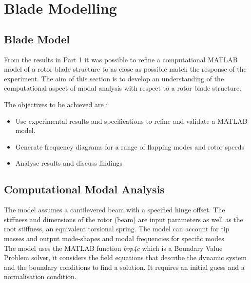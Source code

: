 \documentclass[11pt]{article}
\begin{document}
\section{Blade Modelling}
\subsection{Blade Model}
From the results in Part 1 it was possible to refine a computational MATLAB model of a rotor blade structure to as close as possible match the response of the experiment.
The aim of this section is to develop an understanding of the computational aspect of modal analysis with respect to a rotor blade structure.

The objectives to be achieved are :

\begin{itemize}
    \item Use experimental results and specifications to refine and validate a MATLAB model.
    \item Generate frequency diagrams for a range of flapping modes and rotor speeds
    \item Analyse results and discuss findings
\end{itemize}{}

\subsection{Computational Modal Analysis}
The model assumes a cantilevered beam with a specified hinge offset. The stiffness and dimensions of the rotor (beam) are input parameters as well as the root stiffness, an equivalent torsional spring. The model can account for tip masses and output mode-shapes and modal frequencies for specific modes.\\
The model uses the MATLAB function \textit{bvp4c} which is a Boundary Value Problem solver, it considers the field equations that describe the dynamic system and the boundary conditions to find a solution. It requires an initial guess and a normalisation condition.
\end{document}
